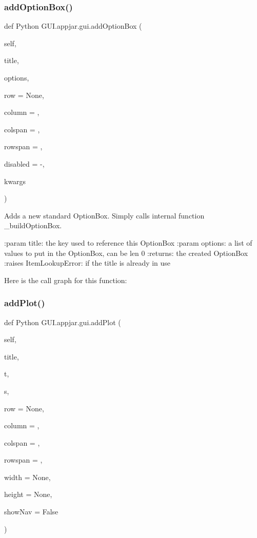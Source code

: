 \subsubsection{\texorpdfstring{add\+Option\+Box()}{addOptionBox()}}
{\footnotesize\ttfamily def Python G\+U\+I.\+appjar.\+gui.\+add\+Option\+Box (\begin{DoxyParamCaption}\item[{}]{self,  }\item[{}]{title,  }\item[{}]{options,  }\item[{}]{row = {\ttfamily None},  }\item[{}]{column = {},  }\item[{}]{colspan = {},  }\item[{}]{rowspan = {},  }\item[{}]{disabled = {\ttfamily \textquotesingle{}-\/\textquotesingle{}},  }\item[{}]{kwargs }\end{DoxyParamCaption})}

\begin{DoxyVerb}Adds a new standard OptionBox.
Simply calls internal function _buildOptionBox.

:param title: the key used to reference this OptionBox
:param options: a list of values to put in the OptionBox, can be len 0
:returns: the created OptionBox
:raises ItemLookupError: if the title is already in use
\end{DoxyVerb}
 Here is the call graph for this function\+:
\mbox{\label{class_python_01_g_u_i_1_1appjar_1_1gui_a9924b1bebbcac84a4e19f1969bf81032}} 
\subsubsection{\texorpdfstring{add\+Plot()}{addPlot()}}
{\footnotesize\ttfamily def Python G\+U\+I.\+appjar.\+gui.\+add\+Plot (\begin{DoxyParamCaption}\item[{}]{self,  }\item[{}]{title,  }\item[{}]{t,  }\item[{}]{s,  }\item[{}]{row = {\ttfamily None},  }\item[{}]{column = {},  }\item[{}]{colspan = {},  }\item[{}]{rowspan = {},  }\item[{}]{width = {\ttfamily None},  }\item[{}]{height = {\ttfamily None},  }\item[{}]{show\+Nav = {\ttfamily False} }\end{DoxyParamCaption})}

